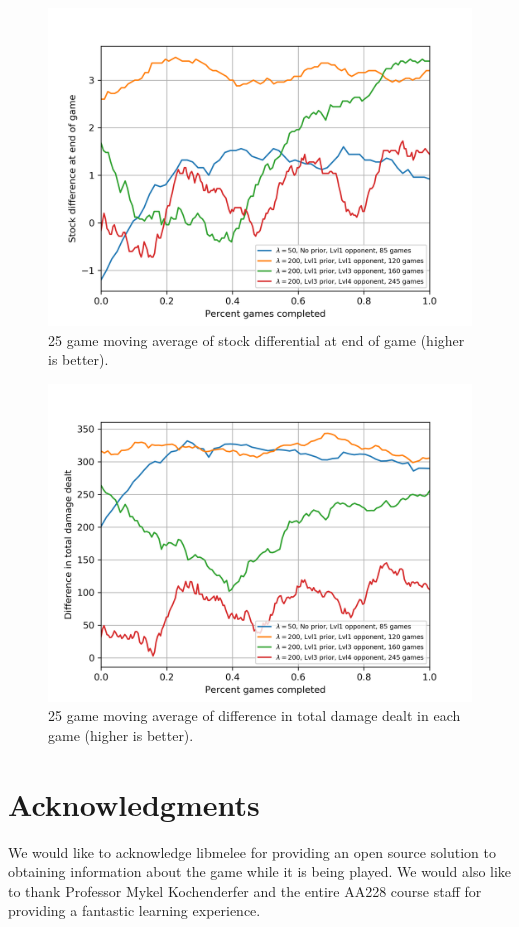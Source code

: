 \documentclass[journal]{new-aiaa}
\begin{document}
\begin{figure}[!htb]
\centering
	\includegraphics[width=120mm]{stocks.png}
	\caption{25 game moving average of stock differential at end of game (higher is better).\label{stocks}}
\end{figure}

\begin{figure}[!htb]
\centering
	\includegraphics[width=120mm]{damage.png}
	\caption{25 game moving average of difference in total damage dealt in each game (higher is better). \label{damage}}
\end{figure}


%
%
\section*{Acknowledgments}

We would like to acknowledge libmelee for providing an open source solution to obtaining information about the game while it is being played. We would also like to thank Professor Mykel Kochenderfer and the entire AA228 course staff for providing a fantastic learning experience. 



\end{document}
